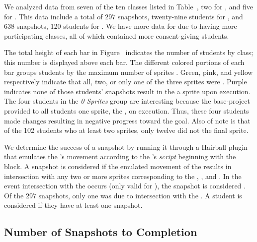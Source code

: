 We analyzed data from seven of the ten classes listed in
Table~, two for \sone{}, and five for \stwo{}. This
data include a total of 297 snapshots, twenty-nine students for \sone{}, and
638 snapshots, 120 students for \stwo{}. We have more data for \stwo{} due to
having more participating classes, all of which contained more consent-giving
students.

The total height of each bar in Figure~
indicates the number of students by class; this number is displayed above each
bar. The different colored portions of each bar groups students by the maximum
number of sprites \caught{}. Green, pink, and yellow respectively indicate that
all, two, or only one of the three sprites were \caught{}. Purple indicates
none of those students' snapshots result in the \net{}  a sprite
upon execution. The four students in the \emph{0 Sprites} group are interesting
because the base-project provided to all students  one sprite, the
\zebra{}, on execution. Thus, these four students made changes resulting in
negative progress toward the goal. Also of note is that of the 102 students who
\caught{} at least two sprites, only twelve did not \catch{} the final sprite.

We determine the success of a snapshot by running it through a Hairball plugin
that emulates the \net{}'s movement according to the \net{}'s \emph{script}
beginning with the \netclicked{} block. A snapshot is considered \com{} if the
emulated movement of the \net{} results in intersection with any two or more
sprites corresponding to the \bear{}, \horse{}, and \zebra{}. In the event
intersection with the \snake{} occurs (only valid for \sone{}), the snapshot is
considered \incom{}. Of the 297 \sone{} snapshots, only one was \incom{} due to
intersection with the \snake{}. A student is considered \com{} if they have at
least one \com{} snapshot.

\subsection{Number of Snapshots to Completion}

